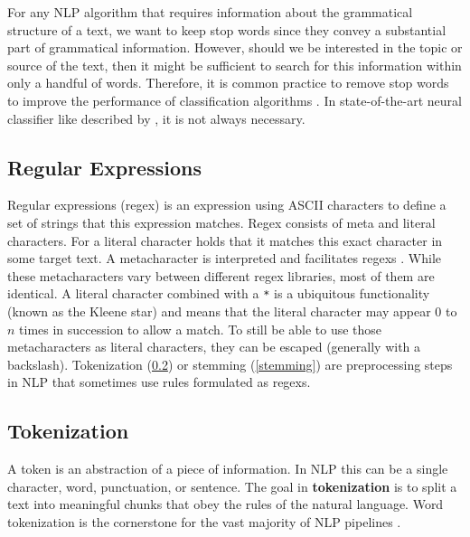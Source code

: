   For any NLP algorithm that requires information about the grammatical structure of a text, we want to keep stop words since they convey a substantial part of grammatical information.
  However, should we be interested in the topic or source of the text, then it might be sufficient to search for this information within only a handful of words.
  Therefore, it is common practice to remove stop words to improve the performance of classification algorithms \citep{McCallum1998, Lodhi2002, Tong2001}.
  In state-of-the-art neural classifier like described by \cite{Howard2018}, it is not always necessary.

\subsection{Regular Expressions}
  Regular expressions (\gls{regex}) is an expression using ASCII characters to define a set of strings that this expression matches.
  Regex consists of meta and literal characters.
  For a literal character holds that it matches this exact character in some target text.
  A metacharacter is interpreted and facilitates regexs \citep{Kleene1951}.
  While these metacharacters vary between different regex libraries, most of them are identical.
  A literal character combined with a \texttt{*} is a ubiquitous functionality (known as the Kleene star) and means that the literal character may appear $0$ to $n$ times in succession to allow a match.
  To still be able to use those metacharacters as literal characters, they can be escaped (generally with a backslash).
  Tokenization (\ref{tokenization}) or stemming (\ref{stemming}) are preprocessing steps in NLP that sometimes use rules formulated as regexs.

\subsection{Tokenization}\label{tokenization}
  A token is an abstraction of a piece of information.
  In NLP this can be a single character, word, punctuation, or sentence.
  The goal in \textbf{tokenization} is to split a text into meaningful chunks that obey the rules of the natural language.
  Word tokenization is the cornerstone for the vast majority of NLP pipelines \citep{Webster1992}.

